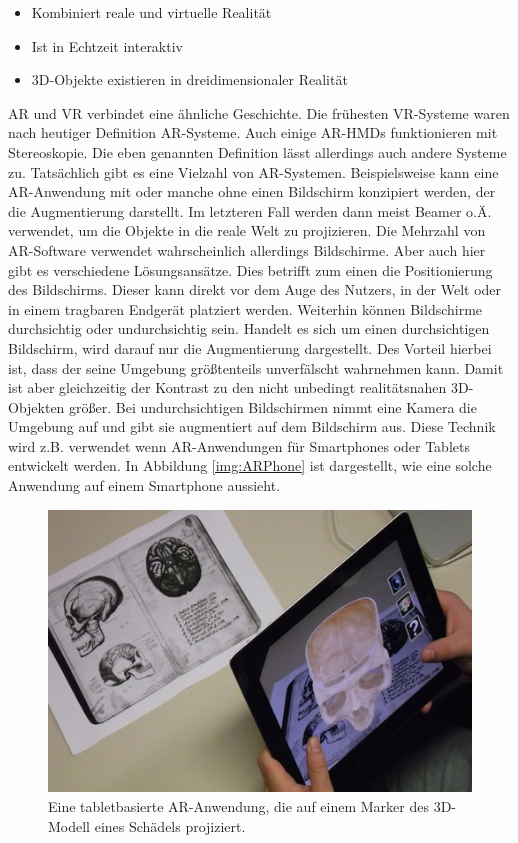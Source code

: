 \begin{itemize}
\item Kombiniert reale und virtuelle Realität
\item Ist in Echtzeit interaktiv
\item 3D-Objekte existieren in dreidimensionaler Realität
\end{itemize}

AR und VR verbindet eine ähnliche Geschichte. Die frühesten VR-Systeme waren nach heutiger Definition AR-Systeme.
Auch einige AR-HMDs funktionieren mit Stereoskopie. Die eben genannten Definition lässt allerdings auch andere Systeme zu. Tatsächlich gibt es eine Vielzahl von AR-Systemen. 
Beispielsweise kann eine AR-Anwendung mit oder manche ohne einen Bildschirm konzipiert werden, der die Augmentierung darstellt. Im letzteren Fall werden dann meist Beamer o.Ä. verwendet, um die Objekte in die reale Welt zu projizieren. 
Die Mehrzahl von AR-Software verwendet wahrscheinlich allerdings Bildschirme. %
Aber auch hier gibt es verschiedene Lösungsansätze. Dies betrifft zum einen die Positionierung des Bildschirms. Dieser kann direkt vor dem Auge des Nutzers, in der Welt oder in einem tragbaren Endgerät platziert werden.
Weiterhin können Bildschirme durchsichtig oder undurchsichtig sein. Handelt es sich um einen durchsichtigen Bildschirm, wird darauf nur die Augmentierung dargestellt. Des Vorteil hierbei ist, dass der seine Umgebung größtenteils unverfälscht wahrnehmen kann. Damit ist aber gleichzeitig der Kontrast zu den nicht unbedingt realitätsnahen 3D-Objekten größer.
Bei undurchsichtigen Bildschirmen nimmt eine Kamera die Umgebung auf und gibt sie augmentiert auf dem Bildschirm aus. Diese Technik wird z.B. verwendet wenn AR-Anwendungen für Smartphones oder Tablets entwickelt werden. In Abbildung \ref{img:ARPhone} ist dargestellt, wie eine solche Anwendung auf einem Smartphone aussieht.

\begin{figure}
	\centering
	\includegraphics[width=0.5\linewidth]{images/App_iSkull,_an_augmented_human_skull.jpg}
	\caption{Eine tabletbasierte AR-Anwendung, die auf einem Marker des 3D-Modell  eines Schädels projiziert.}
	\label{img:ARMarker}
\end{figure}

